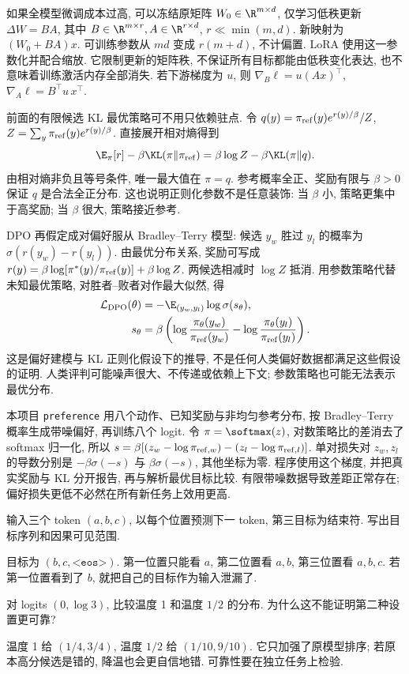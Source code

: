 如果全模型微调成本过高, 可以冻结原矩阵 $W_0\in\R^{m\times d}$, 仅学习低秩更新 $\Delta W=BA$, 其中 $B\in\R^{m\times r},A\in\R^{r\times d}$, $r\ll\min(m,d)$. 新映射为 $(W_0+BA)x$. 可训练参数从 $md$ 变成 $r(m+d)$, 不计偏置. LoRA 使用这一参数化并配合缩放\cite{lora}. 它限制更新的矩阵秩, 不保证所有目标都能由低秩变化表达, 也不意味着训练激活内存全部消失. 若下游梯度为 $u$, 则 $\nabla_B\ell=u(Ax)^\top$, $\nabla_A\ell=B^\top u\,x^\top$.

前面的有限候选 KL 最优策略可不用只依赖驻点. 令
$q(y)=\pi_{\rm ref}(y)e^{r(y)/\beta}/Z$, $Z=\sum_y\pi_{\rm ref}(y)e^{r(y)/\beta}$. 直接展开相对熵得到
\[
\E_\pi[r]-\beta\KL(\pi\Vert\pi_{\rm ref})
=\beta\log Z-\beta\KL(\pi\Vert q).
\]
由相对熵非负且等号条件, 唯一最大值在 $\pi=q$. 参考概率全正、奖励有限与 $\beta>0$ 保证 $q$ 是合法全正分布. 这也说明正则化参数不是任意装饰: 当 $\beta$ 小, 策略更集中于高奖励; 当 $\beta$ 很大, 策略接近参考.

DPO 再假定成对偏好服从 Bradley--Terry 模型: 候选 $y_w$ 胜过 $y_l$ 的概率为 $\sigma(r(y_w)-r(y_l))$. 由最优分布关系, 奖励可写成
$r(y)=\beta\log[\pi^*(y)/\pi_{\rm ref}(y)]+\beta\log Z$. 两候选相减时 $\log Z$ 抵消. 用参数策略代替未知最优策略, 对胜者--败者对作最大似然, 得
\[
\begin{aligned}
\mathcal L_{\rm DPO}(\theta)
&=-\E_{(y_w,y_l)}\log\sigma(s_\theta),\\
s_\theta
&=\beta\left(\log\frac{\pi_\theta(y_w)}{\pi_{\rm ref}(y_w)}
 -\log\frac{\pi_\theta(y_l)}{\pi_{\rm ref}(y_l)}\right).
\end{aligned}
\]
这是偏好建模与 KL 正则化假设下的推导, 不是任何人类偏好数据都满足这些假设的证明. 人类评判可能噪声很大、不传递或依赖上下文; 参数策略也可能无法表示最优分布.

本项目 \texttt{preference} 用八个动作、已知奖励与非均匀参考分布, 按 Bradley--Terry 概率生成带噪偏好, 再训练八个 logit. 令 $\pi=\softmax(z)$, 对数策略比的差消去了 softmax 归一化, 所以
$s=\beta[(z_w-\log\pi_{{\rm ref},w})-(z_l-\log\pi_{{\rm ref},l})]$.
单对损失对 $z_w,z_l$ 的导数分别是 $-\beta\sigma(-s)$ 与 $\beta\sigma(-s)$, 其他坐标为零. 程序使用这个梯度, 并把真实奖励与 KL 分开报告, 再与解析最优目标比较. 有限带噪数据导致差距正常存在; 偏好损失更低不必然在所有新任务上效用更高.

\begin{exercise}
输入三个 token $(a,b,c)$, 以每个位置预测下一 token, 第三目标为结束符. 写出目标序列和因果可见范围.
\end{exercise}
\begin{solution}
目标为 $(b,c,\texttt{<eos>})$. 第一位置只能看 $a$, 第二位置看 $a,b$, 第三位置看 $a,b,c$. 若第一位置看到了 $b$, 就把自己的目标作为输入泄漏了.
\end{solution}
\begin{exercise}
对 logits $(0,\log3)$, 比较温度 1 和温度 $1/2$ 的分布. 为什么这不能证明第二种设置更可靠?
\end{exercise}
\begin{solution}
温度 1 给 $(1/4,3/4)$, 温度 $1/2$ 给 $(1/10,9/10)$. 它只加强了原模型排序; 若原本高分候选是错的, 降温也会更自信地错. 可靠性要在独立任务上检验.
\end{solution}
\label{ch:end:08}
